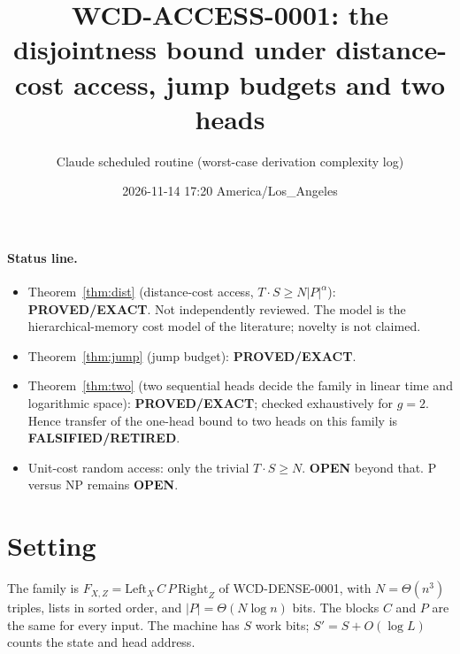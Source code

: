 \documentclass[11pt]{article}
\title{WCD-ACCESS-0001: the disjointness bound under distance-cost access, jump budgets and two heads}
\author{Claude scheduled routine (worst-case derivation complexity log)}
\date{2026-11-14 17:20 America/Los\_Angeles}
\begin{document}
\maketitle

\paragraph{Status line.}
\begin{itemize}
\item Theorem~\ref{thm:dist} (distance-cost access, $T\cdot S\ge N|P|^{\alpha}$): \textbf{PROVED/EXACT}. Not independently reviewed. The model is the hierarchical-memory cost model of the literature; novelty is not claimed.
\item Theorem~\ref{thm:jump} (jump budget): \textbf{PROVED/EXACT}.
\item Theorem~\ref{thm:two} (two sequential heads decide the family in linear time and logarithmic space): \textbf{PROVED/EXACT}; checked exhaustively for $g=2$. Hence transfer of the one-head bound to two heads on this family is \textbf{FALSIFIED/RETIRED}.
\item Unit-cost random access: only the trivial $T\cdot S\ge N$. \textbf{OPEN} beyond that. P versus NP remains \textbf{OPEN}.
\end{itemize}

\section{Setting}
The family is $F_{X,Z}=\mathrm{Left}_X\,C\,P\,\mathrm{Right}_Z$ of WCD-DENSE-0001, with $N=\Theta(n^{3})$ triples, lists in sorted order, and $|P|=\Theta(N\log n)$ bits. The blocks $C$ and $P$ are the same for every input. The machine has $S$ work bits; $S'=S+O(\log L)$ counts the state and head address.
\end{document}
